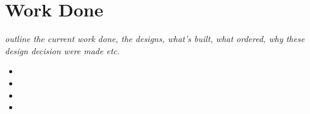 \chapter{Work Done}\label{C:work}

\textit{outline the current work done, the designs, what's built, what ordered, why these design decision were made etc.}

\begin{itemize}
    \item 
    \item 
    \item 
    \item 
\end{itemize}